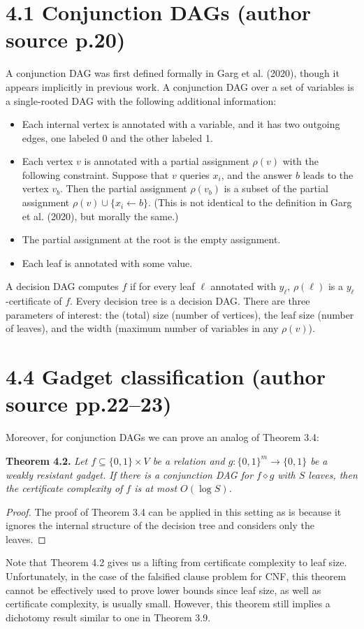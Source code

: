 \documentclass[10pt,a4paper]{article}
\newcommand{\bits}{\{0,1\}}
\newcommand{\comp}{\diamond}
\newenvironment{originalresult}[1]{\par\medskip\noindent\textbf{#1.}\itshape}{\par\medskip}
\begin{document}
\section*{4.1 Conjunction DAGs (author source p.20)}
A conjunction DAG was first defined formally in Garg et al. (2020), though it appears implicitly in previous work. A conjunction DAG over a set of variables is a single-rooted DAG with the following additional information:
\begin{itemize}
\item Each internal vertex is annotated with a variable, and it has two outgoing edges, one labeled 0 and the other labeled 1.
\item Each vertex $v$ is annotated with a partial assignment $\rho(v)$ with the following constraint. Suppose that $v$ queries $x_i$, and the answer $b$ leads to the vertex $v_b$. Then the partial assignment $\rho(v_b)$ is a subset of the partial assignment $\rho(v)\cup\{x_i\leftarrow b\}$. (This is not identical to the definition in Garg et al. (2020), but morally the same.)
\item The partial assignment at the root is the empty assignment.
\item Each leaf is annotated with some value.
\end{itemize}
A decision DAG computes $f$ if for every leaf $\ell$ annotated with $y_\ell$, $\rho(\ell)$ is a $y_\ell$-certificate of $f$.
Every decision tree is a decision DAG. There are three parameters of interest: the (total) size (number of vertices), the leaf size (number of leaves), and the width (maximum number of variables in any $\rho(v)$).

\section*{4.4 Gadget classification (author source pp.22--23)}
Moreover, for conjunction DAGs we can prove an analog of Theorem 3.4:
\begin{originalresult}{Theorem 4.2}
Let $f\subseteq\bits\times V$ be a relation and $g:\bits^m\to\bits$ be a weakly resistant gadget. If there is a conjunction DAG for $f\comp g$ with $S$ leaves, then the certificate complexity of $f$ is at most $O(\log S)$.
\end{originalresult}
\begin{proof}
The proof of Theorem 3.4 can be applied in this setting as is because it ignores the internal structure of the decision tree and considers only the leaves.
\end{proof}
Note that Theorem 4.2 gives us a lifting from certificate complexity to leaf size. Unfortunately, in the case of the falsified clause problem for CNF, this theorem cannot be effectively used to prove lower bounds since leaf size, as well as certificate complexity, is usually small. However, this theorem still implies a dichotomy result similar to one in Theorem 3.9.
\end{document}

